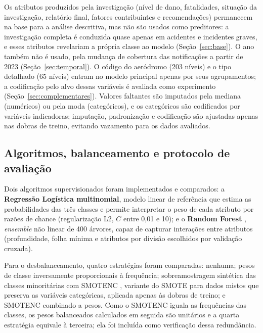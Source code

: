 \documentclass[12pt]{article}
\begin{document}
    Os atributos produzidos pela investigação (nível de dano, fatalidades, situação da investigação, relatório final, fatores contribuintes e recomendações) permanecem na base para a análise descritiva, mas não são usados como preditores: a investigação completa é conduzida quase apenas em acidentes e incidentes graves, e esses atributos revelariam a própria classe ao modelo (Seção~\ref{sec:base}). O ano também não é usado, pela mudança de cobertura das notificações a partir de 2023 (Seção~\ref{sec:temporal}). O código do aeródromo (203 níveis) e o tipo detalhado (65 níveis) entram no modelo principal apenas por seus agrupamentos; a codificação pelo alvo dessas variáveis é avaliada como experimento (Seção~\ref{sec:complementares}). Valores faltantes são imputados pela mediana (numéricos) ou pela moda (categóricos), e os categóricos são codificados por variáveis indicadoras; imputação, padronização e codificação são ajustadas apenas nas dobras de treino, evitando vazamento para os dados avaliados.

    \subsection{Algoritmos, balanceamento e protocolo de avaliação}
    \label{sec:protocolo}

    Dois algoritmos supervisionados foram implementados e comparados: a \textbf{Regressão Logística multinomial}, modelo linear de referência que estima as probabilidades das três classes e permite interpretar o peso de cada atributo por razões de chance (regularização L2, $C$ entre 0,01 e 10); e o \textbf{Random Forest} \cite{breiman:2001}, \textit{ensemble} não linear de 400 árvores, capaz de capturar interações entre atributos (profundidade, folha mínima e atributos por divisão escolhidos por validação cruzada).

    Para o desbalanceamento, quatro estratégias foram comparadas: nenhuma; pesos de classe inversamente proporcionais à frequência; sobreamostragem sintética das classes minoritárias com SMOTENC \cite{chawla:2002}, variante do SMOTE para dados mistos que preserva as variáveis categóricas, aplicada apenas às dobras de treino; e SMOTENC combinado a pesos. Como o SMOTENC iguala as frequências das classes, os pesos balanceados calculados em seguida são unitários e a quarta estratégia equivale à terceira; ela foi incluída como verificação dessa redundância.
\end{document}
